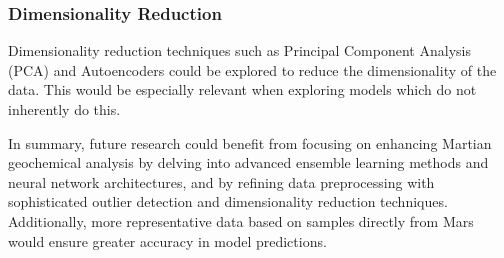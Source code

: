 \subsubsection*{Dimensionality Reduction} Dimensionality reduction techniques such as Principal Component Analysis (PCA) and Autoencoders could be explored to reduce the dimensionality of the data.
This would be especially relevant when exploring models which do not inherently do this.

\vspace{0.25cm}\noindent
In summary, future research could benefit from focusing on enhancing Martian geochemical analysis by delving into advanced ensemble learning methods and neural network architectures, and by refining data preprocessing with sophisticated outlier detection and dimensionality reduction techniques.
Additionally, more representative data based on samples directly from Mars would ensure greater accuracy in model predictions.
